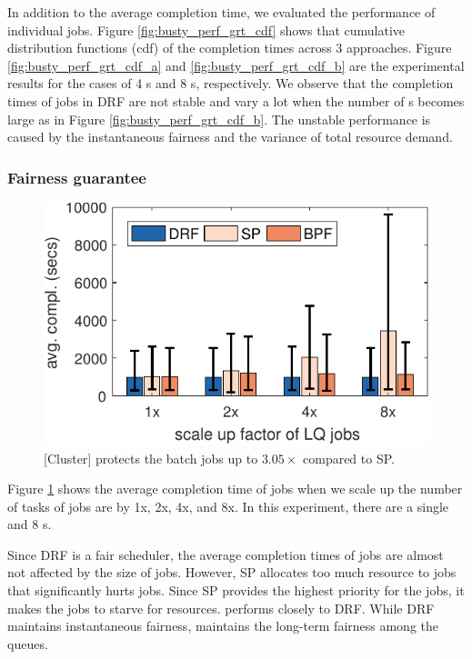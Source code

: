 In addition to the average completion time, we evaluated the performance of individual \burstq jobs.
Figure \ref{fig:busty_perf_grt_cdf} shows that cumulative distribution functions (cdf) of the completion times across 3 approaches.
Figure \ref{fig:busty_perf_grt_cdf_a} and \ref{fig:busty_perf_grt_cdf_b} are the experimental results for the cases of 4 {\batchq}s and 8 {\batchq}s, respectively.
We observe that the completion times of \burstq jobs in DRF are not stable and vary a lot when the number of {\burstq}s becomes large as in Figure \ref{fig:busty_perf_grt_cdf_b}.
The unstable performance is caused by the instantaneous fairness and the variance of total resource demand.

\subsubsection{Fairness guarantee}
\label{sec:fairness_guarantee}

\begin{figure}[!t]
    \centering
    \includegraphics[width=0.8\linewidth]{fig/batch_perf_protect_BB} 
    \caption{[Cluster] \name protects the batch jobs up to $3.05\times$ compared to SP.}
    \vspace{-0.3cm}
    \label{fig:protecting_batch_jobs}
\end{figure}

Figure \ref{fig:protecting_batch_jobs} shows the average completion time of \batchq jobs when we scale up the number of tasks of \burstq jobs are by 1x, 2x, 4x, and 8x.
In this experiment, there are a single \burstq and 8 {\batchq}s.

Since DRF is a fair scheduler, the average completion times of \batchq jobs are almost not affected by the size of \burstq jobs.
However, SP allocates too much resource to \burstq jobs that significantly hurts \batchq jobs.
Since SP provides the highest priority for the {\burstq} jobs, it makes the {\batchq} jobs to starve for resources.
\name performs closely to DRF.
While DRF maintains instantaneous fairness, \name maintains the long-term fairness among the queues.


